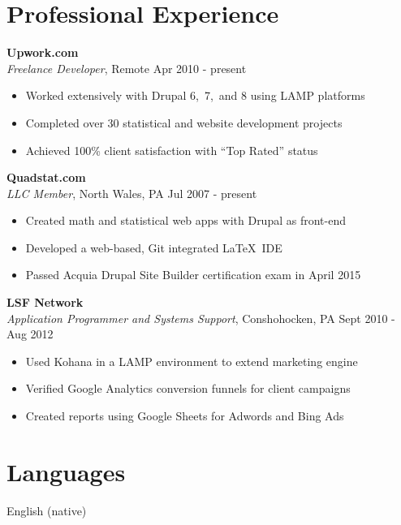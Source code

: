 \documentclass[margin,line]{res}
\begin{document}
\begin{resume}
\section{\sc Professional Experience}  {\bf Upwork.com} \\
{\em Freelance Developer}, Remote \hfill Apr 2010 - present
  
   \begin{itemize} \itemsep -2pt
   \item Worked extensively with Drupal 6,\ 7,\ and 8 using LAMP platforms   
   \item Completed over 30 statistical and website development projects
   \item Achieved 100\% client satisfaction with ``Top Rated'' status  
 \end{itemize}
 
{\bf Quadstat.com} \\
{\em LLC Member}, North Wales, PA \hfill Jul 2007 - present
  
   \begin{itemize} \itemsep -2pt
   \item Created math and statistical web apps with Drupal as front-end
   \item Developed a web-based, Git integrated \LaTeX\ IDE
   \item Passed Acquia Drupal Site Builder certification exam in April 2015 
   
 \end{itemize}
{\bf LSF Network} \\
{\em Application Programmer and Systems Support}, Conshohocken, PA  \hfill Sept 2010 - Aug 2012 

 \begin{itemize} \itemsep -2pt
  \item  Used Kohana in a LAMP environment to extend marketing engine 
  \item  Verified Google Analytics conversion funnels for client campaigns
  \item  Created reports using Google Sheets for Adwords and Bing Ads
\end{itemize}

\section{\sc Languages} English (native)

\end{resume}
\end{document}
